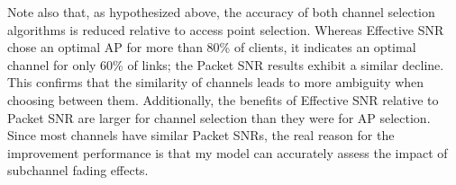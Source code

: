 Note also that, as hypothesized above, the accuracy of both channel selection algorithms is reduced relative to access point selection. Whereas Effective SNR chose an optimal AP for more than 80\% of clients, it indicates an optimal channel for only 60\% of links; the Packet SNR results exhibit a similar decline. This confirms that the similarity of channels leads to more ambiguity when choosing between them. Additionally, the benefits of Effective SNR relative to Packet SNR are larger for channel selection than they were for AP selection. Since most channels have similar Packet SNRs, the real reason for the improvement performance is that my model can accurately assess the impact of subchannel fading effects.

%
%
%
